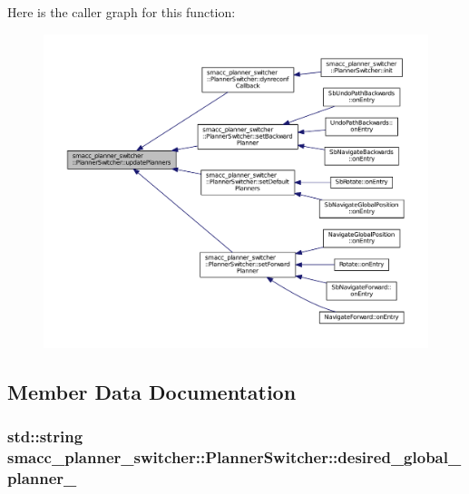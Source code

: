 Here is the caller graph for this function\+:
\nopagebreak
\begin{figure}[H]
\begin{center}
\leavevmode
\includegraphics[width=350pt]{classsmacc__planner__switcher_1_1PlannerSwitcher_ae45c57b459f1eb9ee4cc3c6dc6dc0995_icgraph}
\end{center}
\end{figure}




\subsection{Member Data Documentation}
\subsubsection[{\texorpdfstring{desired\+\_\+global\+\_\+planner\+\_\+}{desired_global_planner_}}]{\setlength{\rightskip}{0pt plus 5cm}std\+::string smacc\+\_\+planner\+\_\+switcher\+::\+Planner\+Switcher\+::desired\+\_\+global\+\_\+planner\+\_\+\hspace{0.3cm}{\ttfamily [private]}}\hypertarget{classsmacc__planner__switcher_1_1PlannerSwitcher_aed229df648a0903e3cdf77682220efb5}{}\label{classsmacc__planner__switcher_1_1PlannerSwitcher_aed229df648a0903e3cdf77682220efb5}


